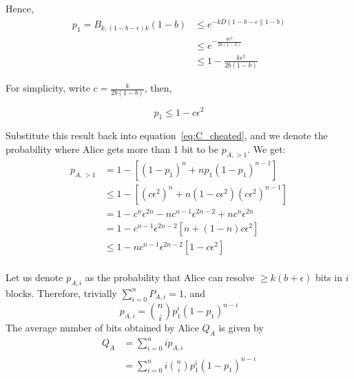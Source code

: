 \documentclass[%
 reprint,
superscriptaddress,
 amsmath,amssymb,
 aps,
]{revtex4-2}
\begin{document}
Hence, 
\begin{equation}
\begin{split}
p_1=B_{k, (1-b-\epsilon)k}(1-b)&\le e^{-kD\left(1-b-\epsilon\|1-b\right)}\\
&\le e^{-\frac{k\epsilon^2}{2b(1-b)}}\\
&\le 1-\frac{k\epsilon^2}{2b(1-b)}
\end{split}
\end{equation}

For simplicity, write $c=\frac{k}{2b(1-b)}$, then,

\begin{equation}
    p_1\le 1 - c\epsilon^2
\end{equation}

Substitute this result back into equation~\ref{eq:C_cheated}, and we denote the probability where Alice gets more than 1 bit to be $p_{A, >1}$. We get:
\begin{equation}
    \begin{split}
        p_{A, >1} &=1-\left[(1-p_1)^n+np_1(1-p_1)^{n-1}\right]\\
        &\le 1-\left[(c\epsilon^2)^n+n(1-c\epsilon^2)(c\epsilon^2)^{n-1}\right]\\
        &=1-c^n\epsilon^{2n}-nc^{n-1}\epsilon^{2n-2}+nc^n\epsilon^{2n}\\
        &=1-c^{n-1}\epsilon^{2n-2}\left[n+(1-n)c\epsilon^2\right]\\
        &\le 1-nc^{n-1}\epsilon^{2n-2}\left[1-c\epsilon^2\right]\\
    \end{split}
    \label{eq:upper_bound_C_cheated}
\end{equation}

Let us denote $p_{A,i}$ as the probability that Alice can resolve $\ge k(b+\epsilon)$ bits in $i$ blocks. Therefore, trivially $\sum_{i=0}^n P_{A, i}=1$, and 
\begin{equation}
    p_{A, i} = \binom{n}{i}p_1^i(1-p_1)^{n-i}
\end{equation}
The average number of bits obtained by Alice $Q_{A}$ is given by
\begin{equation}
\begin{split}
    Q_{A} &= \sum_{i=0}^n ip_{A, i}\\
    &=\sum_{i=0}^ni\binom{n}{i}p_1^i(1-p_1)^{n-i}
\end{split}
\end{equation}
\end{document}
